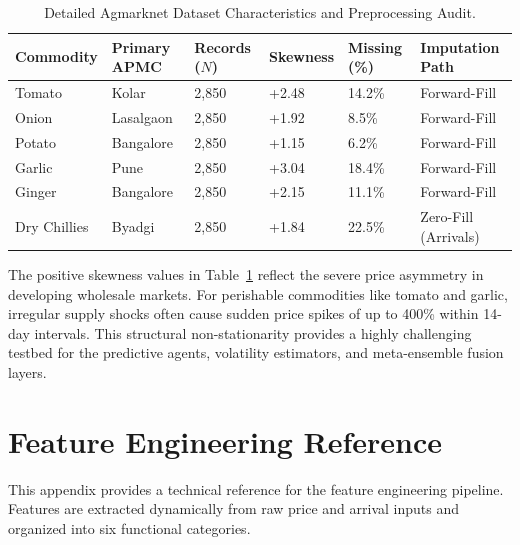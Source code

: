 \documentclass[12pt,a4paper]{report}
\theoremstyle{definition}
\theoremstyle{remark}
\begin{document}
\begin{table}[htbp]
\centering
\caption{Detailed Agmarknet Dataset Characteristics and Preprocessing Audit.}
\label{tab:detailed_dataset_stats}
\begin{tabular}{p{2.5cm}|p{2.5cm}|p{2.0cm}|p{2.2cm}|p{2.2cm}|p{2.2cm}}
\hline
\textbf{Commodity} & \textbf{Primary APMC} & \textbf{Records ($N$)} & \textbf{Skewness} & \textbf{Missing (\%) } & \textbf{Imputation Path} \\
\hline
Tomato & Kolar & 2,850 & +2.48 & 14.2\% & Forward-Fill \\
Onion & Lasalgaon & 2,850 & +1.92 & 8.5\% & Forward-Fill \\
Potato & Bangalore & 2,850 & +1.15 & 6.2\% & Forward-Fill \\
Garlic & Pune & 2,850 & +3.04 & 18.4\% & Forward-Fill \\
Ginger & Bangalore & 2,850 & +2.15 & 11.1\% & Forward-Fill \\
Dry Chillies & Byadgi & 2,850 & +1.84 & 22.5\% & Zero-Fill (Arrivals) \\
\hline
\end{tabular}
\end{table}

The positive skewness values in Table~\ref{tab:detailed_dataset_stats} reflect the severe price asymmetry in developing wholesale markets. For perishable commodities like tomato and garlic, irregular supply shocks often cause sudden price spikes of up to 400\% within 14-day intervals. This structural non-stationarity provides a highly challenging testbed for the predictive agents, volatility estimators, and meta-ensemble fusion layers.

\chapter{Feature Engineering Reference}
\label{app:feature_engineering}

This appendix provides a technical reference for the feature engineering pipeline. Features are extracted dynamically from raw price and arrival inputs and organized into six functional categories.
\end{document}
